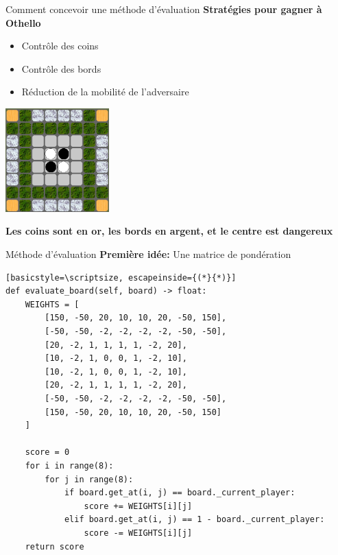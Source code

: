 \begin{frame}[t]{Comment concevoir une méthode d'évaluation}
    \textbf{Stratégies pour gagner à Othello}
    \begin{itemize}
        \item Contrôle des coins 
        \item Contrôle des bords 
        \item Réduction de la mobilité de l'adversaire
    \end{itemize}
    \begin{center}
        \includegraphics[width=0.3\textwidth]{img/eval_0.png}
    \end{center}
    \textbf{Les coins sont en or, les bords en argent, et le centre est dangereux}
\end{frame}

\begin{frame}[t,fragile]{Méthode d'évaluation}
    \textbf{Première idée:}
    Une matrice de pondération
    \begin{lstlisting}[basicstyle=\scriptsize, escapeinside={(*}{*)}]
def evaluate_board(self, board) -> float:
    WEIGHTS = [
        [150, -50, 20, 10, 10, 20, -50, 150],
        [-50, -50, -2, -2, -2, -2, -50, -50],
        [20, -2, 1, 1, 1, 1, -2, 20],
        [10, -2, 1, 0, 0, 1, -2, 10],
        [10, -2, 1, 0, 0, 1, -2, 10],
        [20, -2, 1, 1, 1, 1, -2, 20],
        [-50, -50, -2, -2, -2, -2, -50, -50],
        [150, -50, 20, 10, 10, 20, -50, 150]
    ]
    
    score = 0
    for i in range(8):
        for j in range(8):
            if board.get_at(i, j) == board._current_player:
                score += WEIGHTS[i][j]
            elif board.get_at(i, j) == 1 - board._current_player:
                score -= WEIGHTS[i][j]
    return score
    \end{lstlisting}
\end{frame}

